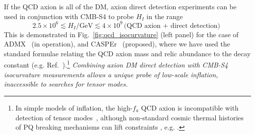 If the QCD axion is all of the DM, axion direct detection experiments can be used in conjunction with CMB-S4 to probe $H_I$ in the range
\begin{equation}
 2.5\times 10^6\lesssim H_I/\text{GeV}\lesssim 4\times 10^9\, 
\text{(QCD axion + direct detection)}\, \,
\end{equation}
This is demonstrated in Fig.~\ref{fig:qcd_isocurvature} (left panel) for the case of ADMX~\cite{Asztalos:2009yp} (in operation), and CASPEr~\cite{Budker:2013hf} (proposed), where we have used the standard formulae relating the QCD axion mass and relic abundance to the decay constant (e.g. Ref.~\cite{Fox:2004kb}).\footnote{In simple models of inflation, the high-$f_a$ QCD axion is incompatible with detection of tensor modes~\cite{Fox:2004kb,Hertzberg:2008wr,Visinelli:2014twa,Marsh:2014qoa,Visinelli:2014twa}, although non-standard cosmic thermal histories of PQ breaking mechanisms can lift constraints , e.g. \cite{Higaki:2014ooa,Fairbairn:2014zta,Nomura:2015xil}.} \emph{Combining axion DM direct detection with CMB-S4 isocurvature measurements allows a unique probe of low-scale inflation, inaccessible to searches for tensor modes.}

